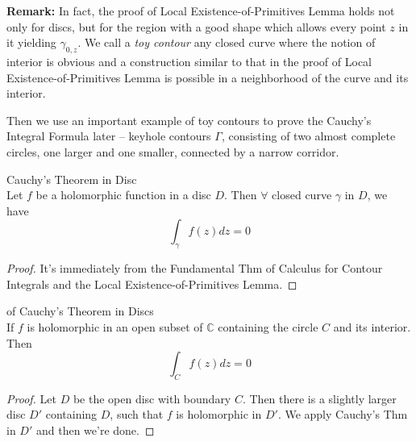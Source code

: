 \noindent\textbf{Remark:} In fact, the proof of Local Existence-of-Primitives Lemma holds not only for discs, but for the region with a good shape which allows every point $z$ in it yielding $\gamma_{0,z}$. We call a \textit{toy contour} any closed curve where the notion of interior is obvious and a construction similar to that in the proof of Local Existence-of-Primitives Lemma is possible in a neighborhood of the curve and its interior. 

Then we use an important example of toy contours to prove the Cauchy's Integral Formula later -- keyhole contours $\Gamma$, consisting of two almost complete circles, one larger and one smaller, connected by a narrow corridor.

\begin{figure}[htbp]
  \centering
\end{figure}

\begin{theorem}{Cauchy's Theorem in Disc}\\
Let $f$ be a holomorphic function in a disc $D$. Then $\forall$ closed curve $\gamma$ in $D$, we have
\[
\int_\gamma f(z)dz=0
\]
\end{theorem}

\begin{proof}
    It's immediately from the Fundamental Thm of Calculus for Contour Integrals and the Local Existence-of-Primitives Lemma.
\end{proof}

\begin{corollary}{of Cauchy's Theorem in Discs}\\
If $f$ is holomorphic in an open subset of $\mathbb{C}$ containing the circle $C$ and its interior. Then
\[
\int_C f(z)dz=0
\]
\end{corollary}

\begin{proof}
    Let $D$ be the open disc with boundary $C$. Then there is a slightly larger disc $D'$ containing $D$, such that $f$ is holomorphic in $D'$. We apply Cauchy's Thm in $D'$ and then we're done.
\end{proof}

